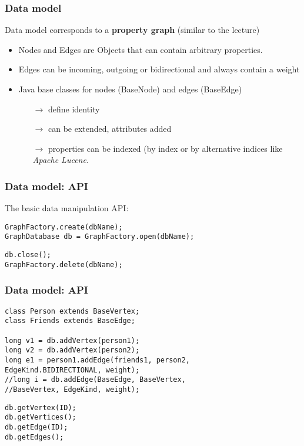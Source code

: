
\begin{frame}
\frametitle{Data model}

Data model corresponds to a \textbf{property graph} (similar to the lecture)
\begin{itemize}
	\item Nodes and Edges are Objects that can contain arbitrary properties.
	\item Edges can be incoming, outgoing or bidirectional and always contain a weight
	\item Java base classes for nodes (BaseNode) and edges (BaseEdge)
	\begin{itemize}
		\item[$\rightarrow$] define identity
		\item[$\rightarrow$] can be extended, attributes added
		\item[$\rightarrow$] properties can be indexed (by  index
		or by alternative indices like \textit{Apache Lucene}.
	\end{itemize}
\end{itemize}

\end{frame} 

\begin{frame}[fragile]
\frametitle{Data model: API}

The basic data manipulation API:

\begin{lstlisting}[caption=(Creating / opening a DB)]
GraphFactory.create(dbName);
GraphDatabase db = GraphFactory.open(dbName);
\end{lstlisting}

\begin{lstlisting}[caption=(Closing / deleting a DB)]
db.close();
GraphFactory.delete(dbName);
\end{lstlisting}

\end{frame}

\begin{frame}[fragile]
\frametitle{Data model: API}

\begin{lstlisting}[caption=(Vertex / Edge creation)]
class Person extends BaseVertex;
class Friends extends BaseEdge;

long v1 = db.addVertex(person1);
long v2 = db.addVertex(person2);
long e1 = person1.addEdge(friends1, person2, 
EdgeKind.BIDIRECTIONAL, weight);
//long i = db.addEdge(BaseEdge, BaseVertex, 
//BaseVertex, EdgeKind, weight);
\end{lstlisting}

\begin{lstlisting}[caption=(Vertex / Edge retrieval)]
db.getVertex(ID);
db.getVertices();
db.getEdge(ID);
db.getEdges();
\end{lstlisting}

\end{frame}

